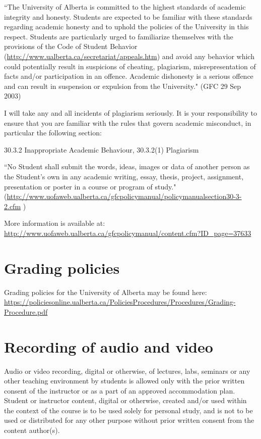\documentclass[11pt,]{article}
\begin{document}
``The University of Alberta is committed to the highest standards of
academic integrity and honesty. Students are expected to be familiar
with these standards regarding academic honesty and to uphold the
policies of the University in this respect. Students are particularly
urged to familiarize themselves with the provisions of the Code of
Student Behavior (\url{http://www.ualberta.ca/secretariat/appeals.htm})
and avoid any behavior which could potentially result in suspicions of
cheating, plagiarism, misrepresentation of facts and/or participation in
an offence. Academic dishonesty is a serious offence and can result in
suspension or expulsion from the University." (GFC 29 Sep 2003)

I will take any and all incidents of plagiarism seriously. It is your
responsibility to ensure that you are familiar with the rules that
govern academic misconduct, in particular the following section:

30.3.2 Inappropriate Academic Behaviour, 30.3.2(1) Plagiarism

``No Student shall submit the words, ideas, images or data of another
person as the Student's own in any academic writing, essay, thesis,
project, assignment, presentation or poster in a course or program of
study."
(\url{http://www.uofaweb.ualberta.ca/gfcpolicymanual/policymanualsection30-3-2.cfm}
)

More information is available at:
\url{http://www.uofaweb.ualberta.ca/gfcpolicymanual/content.cfm?ID_page=37633}

\hypertarget{grading-policies}{%
\section{Grading policies}\label{grading-policies}}

Grading policies for the University of Alberta may be found here:
\url{https://policiesonline.ualberta.ca/PoliciesProcedures/Procedures/Grading-Procedure.pdf}

\hypertarget{recording-of-audio-and-video}{%
\section{Recording of audio and
video}\label{recording-of-audio-and-video}}

Audio or video recording, digital or otherwise, of lectures, labs,
seminars or any other teaching environment by students is allowed only
with the prior written consent of the instructor or as a part of an
approved accommodation plan. Student or instructor content, digital or
otherwise, created and/or used within the context of the course is to be
used solely for personal study, and is not to be used or distributed for
any other purpose without prior written consent from the content
author(s).
\end{document}
